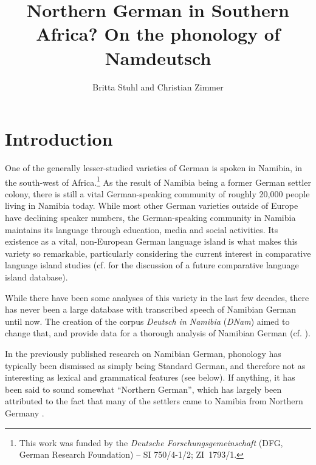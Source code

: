 \documentclass[output=paper]{langsci/langscibook}
\author{Britta Stuhl\affiliation{Freie Universität Berlin} and Christian Zimmer\affiliation{Freie Universität Berlin}}
\title[Norhtern German in Southern Africa?]
      {Northern German in Southern Africa? On the phonology of Namdeutsch}
\begin{document}
\maketitle 


\section{Introduction}
\label{sec:stuhl:1}

One of the generally lesser-studied varieties of German is spoken in Namibia, in the south-west of Africa.\footnote{This work was funded by the \textit{Deutsche Forschungsgemeinschaft} (DFG, German Research Foundation) – SI 750/4-1/2; ZI~1793/1.} As the result of Namibia being a former German settler colony, there is still a vital German-speaking community of roughly 20,000 people living in Namibia today. While most other German varieties outside of Europe have declining speaker numbers, the German-speaking community in Namibia maintains its language through education, media and social activities. Its existence as a vital, non-European German language island is what makes this variety so remarkable, particularly considering the current interest in comparative language island studies (cf. \citealt{boas_variation_2016} for the discussion of a future comparative language island database). 

While there have been some analyses of this variety in the last few decades, there has never been a large database with transcribed speech of Namibian German until now. The creation of the corpus \textit{Deutsch in Namibia} (\textit{DNam}) aimed to change that, and provide data for a thorough analysis of Namibian German (cf. \citealt{zimmer_korpus_2020}). 

In the previously published research on Namibian German, phonology has typically been dismissed as simply being Standard German, and therefore not as interesting as lexical and grammatical features (see below). If anything, it has been said to sound somewhat “Northern German”, which has largely been attributed to the fact that many of the settlers came to Namibia from Northern Germany \citep[564]{bohm_deutsch_2003}. 
\end{document}
